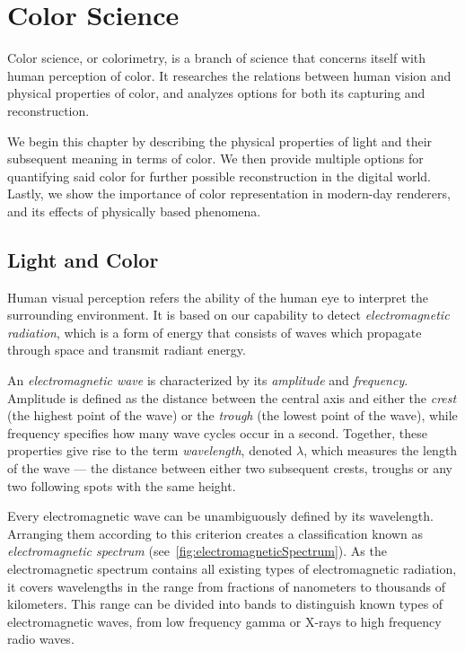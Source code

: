 \chapter{Color Science} \label{chap:colorScience}

Color science, or colorimetry, is a branch of science that concerns itself with human perception of color. It researches the relations between human vision and physical properties of color, and analyzes options for both its capturing and reconstruction.

We begin this chapter by describing the physical properties of light and their subsequent meaning in terms of color. We then provide multiple options for quantifying said color for further possible reconstruction in the digital world. Lastly, we show the importance of color representation in modern-day renderers, and its effects of physically based phenomena.

\section{Light and Color}

Human visual perception refers the ability of the human eye to interpret the surrounding environment. It is based on our capability to detect \emph{electromagnetic radiation}, which is a form of energy that consists of waves which propagate through space and transmit radiant energy.

An \emph{electromagnetic wave} is characterized by its \emph{amplitude} and \emph{frequency}. Amplitude is defined as the distance between the central axis and either the \emph{crest} (the highest point of the wave) or the \emph{trough} (the lowest point of the wave), while frequency specifies how many wave cycles occur in a second. Together, these properties give rise to the term \emph{wavelength}, denoted $\lambda$, which measures the length of the wave --- the distance between either two subsequent crests, troughs or any two following spots with the same height. 

Every electromagnetic wave can be unambiguously defined by its wavelength. Arranging them according to this criterion creates a classification known as \emph{electromagnetic spectrum} (see~\cref{fig:electromagneticSpectrum}). As the electromagnetic spectrum contains all existing types of electromagnetic radiation, it covers wavelengths in the range from fractions of nanometers to thousands of kilometers. This range can be divided into bands to distinguish known types of electromagnetic waves, from low frequency gamma or X-rays to high frequency radio waves. 

